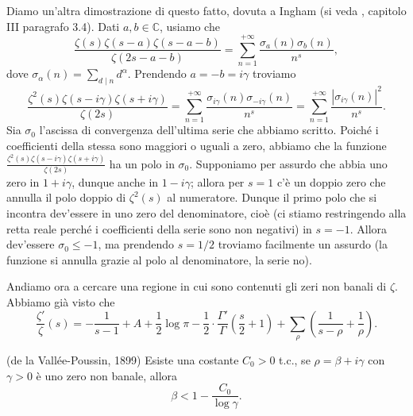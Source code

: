 Diamo un'altra dimostrazione di questo fatto, dovuta a Ingham (si veda \cite{T}, capitolo III paragrafo 3.4). Dati $a,b \in \mathbb{C}$, usiamo che
$$\frac{\zeta(s)\zeta(s-a)\zeta(s-a-b)}{\zeta(2s-a-b)}=\sum_{n=1}^{+\infty} \frac{\sigma_a(n)\sigma_b(n)}{n^s},$$
dove $\displaystyle \sigma_{\alpha}(n)=\sum_{d \mid n} d^{\alpha}$. Prendendo $a=-b=i\gamma$ troviamo
$$\frac{\zeta^2(s)\zeta(s-i\gamma)\zeta(s+i\gamma)}{\zeta(2s)}=\sum_{n=1}^{+\infty} \frac{\sigma_{i\gamma}(n)\sigma_{-i\gamma}(n)}{n^s}=\sum_{n=1}^{+\infty} \frac{|\sigma_{i\gamma}(n)|^2}{n^s}.$$
Sia $\sigma_0$ l'ascissa di convergenza dell'ultima serie che abbiamo scritto. Poiché i coefficienti della stessa sono maggiori o uguali a zero, abbiamo che la funzione $\frac{\zeta^2(s)\zeta(s-i\gamma)\zeta(s+i\gamma)}{\zeta(2s)}$ ha un polo in $\sigma_0$. Supponiamo per assurdo che abbia uno zero in $1+i\gamma$, dunque anche in $1-i\gamma$; allora per $s=1$ c'è un doppio zero che annulla il polo doppio di $\zeta^2(s)$ al numeratore. Dunque il primo polo che si incontra dev'essere in uno zero del denominatore, cioè (ci stiamo restringendo alla retta reale perché i coefficienti della serie sono non negativi) in $s=-1$. Allora dev'essere $\sigma_0 \le -1$, ma prendendo $s=1/2$ troviamo facilmente un assurdo (la funzione si annulla grazie al polo al denominatore, la serie no).

Andiamo ora a cercare una regione in cui sono contenuti gli zeri non banali di $\zeta$. Abbiamo già visto che
$$\frac{\zeta'}{\zeta}(s)=-\frac{1}{s-1}+A+\frac{1}{2}\log{\pi}-\frac{1}{2}\cdot\frac{\Gamma'}{\Gamma}\left(\frac{s}{2}+1\right)+\sum_{\rho}\left(\frac{1}{s-\rho}+\frac{1}{\rho}\right).$$

\begin{prop}
  (de la Vallée-Poussin, 1899) Esiste una costante $C_0>0$ t.c., se $\rho=\beta+i\gamma$ con $\gamma>0$ è uno zero non banale, allora
  \begin{equation}
    \beta<1-\frac{C_0}{\log{\gamma}}.
  \end{equation}
\end{prop}


